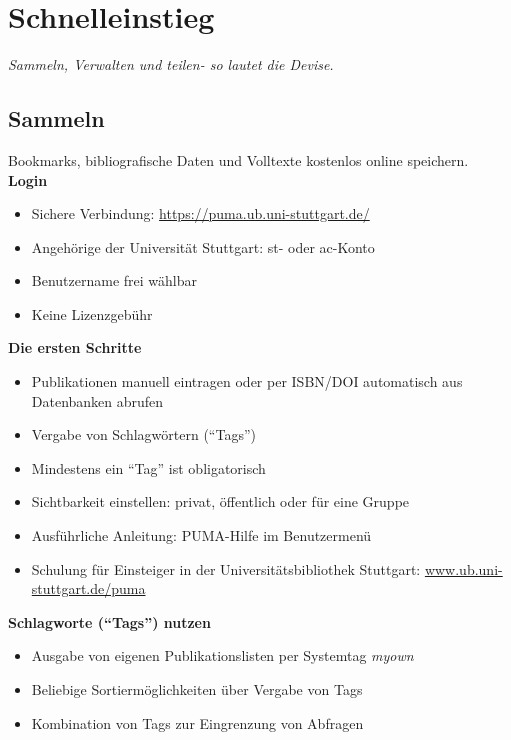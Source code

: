 \chapter{Schnelleinstieg}
\textit{Sammeln, Verwalten und teilen- so lautet die Devise.}
\section{Sammeln}
Bookmarks, bibliografische Daten und Volltexte kostenlos online speichern.\newline\newline
\textbf{Login}
\begin{itemize}
\item Sichere Verbindung: \url{https://puma.ub.uni-stuttgart.de/}
\item Angehörige der Universität Stuttgart: st- oder ac-Konto
\item Benutzername frei wählbar
\item Keine Lizenzgebühr
\end{itemize}
\textbf{Die ersten Schritte}
\begin{itemize}
\item Publikationen manuell eintragen oder per ISBN/DOI automatisch aus Datenbanken abrufen
\item Vergabe von Schlagwörtern (\enquote{Tags})
\item Mindestens ein \enquote{Tag} ist obligatorisch
\item Sichtbarkeit einstellen: privat, öffentlich oder für eine Gruppe
\item Ausführliche Anleitung: PUMA-Hilfe im Benutzermenü
\item Schulung für Einsteiger in der Universitätsbibliothek Stuttgart: \url{www.ub.uni-stuttgart.de/puma}
\end{itemize}
\textbf{Schlagworte (\enquote{Tags}) nutzen}
\begin{itemize}
\item Ausgabe von eigenen Publikationslisten per Systemtag \textit{myown}
\item Beliebige Sortiermöglichkeiten über Vergabe von Tags
\item Kombination von Tags zur Eingrenzung von Abfragen
\end{itemize}
